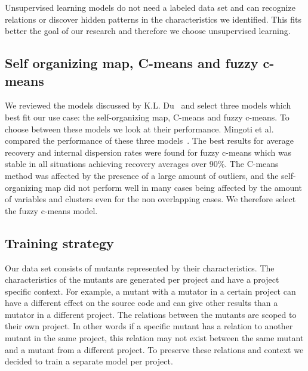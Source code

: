 \documentclass[conference,draftclsnofoot,onecolumn]{IEEEtran}
\begin{document}
Unsupervised learning models do not need a labeled data set and can recognize relations or discover hidden patterns in the characteristics we identified.
This fits better the goal of our research and
therefore we choose unsupervised learning.

\subsection{Self organizing map, C-means and fuzzy c-means}
\label{ch:topThreeModels}
We reviewed the models discussed by K.L. Du~\cite{Du2010Clustering:Approach, thesis} and select three models which best fit our use case:
the self-organizing map, C-means and fuzzy c-means. 
To choose between these models we look at their performance. Mingoti et al. compared the performance of these three models~\cite{Mingoti2006ComparingAlgorithms}.
The best results for average recovery and internal dispersion rates were found for fuzzy c-means which was stable in all situations achieving recovery averages over 90\%. The C-means method was affected by the presence of a large amount of outliers, and the self-organizing map did not perform well in many cases being affected by the amount of variables and clusters even for the non overlapping cases. We therefore select the fuzzy c-means model.

\subsection{Training strategy}
\label{ch:training_strategy}
Our data set consists of mutants represented by their characteristics. 
The characteristics of the mutants are generated per project and have a project specific context.
For example, a mutant with a mutator in a certain project can have a different effect on the source code and can give other results than a mutator in a different project.
The relations between the mutants are scoped to their own project. 
In other words if a specific mutant has a relation to another mutant in the same project, this relation may not exist between the same mutant and a mutant from a different project. To preserve these relations and context we decided to train a separate model per project.
\end{document}
